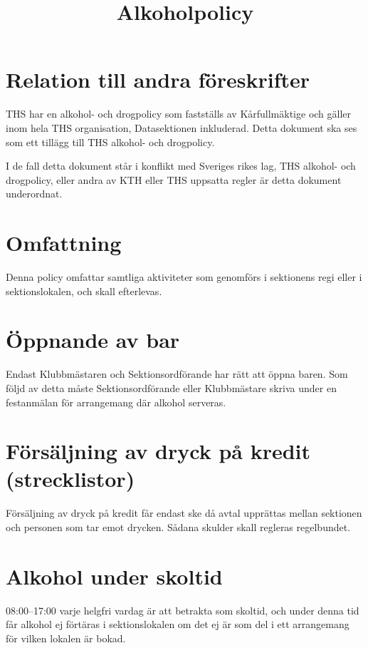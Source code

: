 \documentclass{dgovdoc}
\title{Alkoholpolicy}
\begin{document}
\maketitle

\section{Relation till andra föreskrifter}

THS har en alkohol- och drogpolicy som fastställs av Kårfullmäktige och gäller
inom hela THS organisation, Datasektionen inkluderad. Detta dokument ska ses
som ett tillägg till THS alkohol- och drogpolicy.

I de fall detta dokument står i konﬂikt med Sveriges rikes lag, THS alkohol-
och drogpolicy, eller andra av KTH eller THS uppsatta regler är detta dokument
underordnat.

\section{Omfattning}

Denna policy omfattar samtliga aktiviteter som genomförs i sektionens regi
eller i sektionslokalen, och skall efterlevas.

\section{Öppnande av bar}

Endast Klubbmästaren och Sektionsordförande har rätt att öppna baren. Som följd
av detta måste Sektionsordförande eller Klubbmästare skriva under en
festanmälan för arrangemang där alkohol serveras.

\section{Försäljning av dryck på kredit (strecklistor)}

Försäljning av dryck på kredit får endast ske då avtal upprättas mellan
sektionen och personen som tar emot drycken. Sådana skulder skall regleras
regelbundet.

\section{Alkohol under skoltid}

08:00--17:00 varje helgfri vardag är att betrakta som skoltid, och under denna
tid får alkohol ej förtäras i sektionslokalen om det ej är som del i ett
arrangemang för vilken lokalen är bokad.
\end{document}
